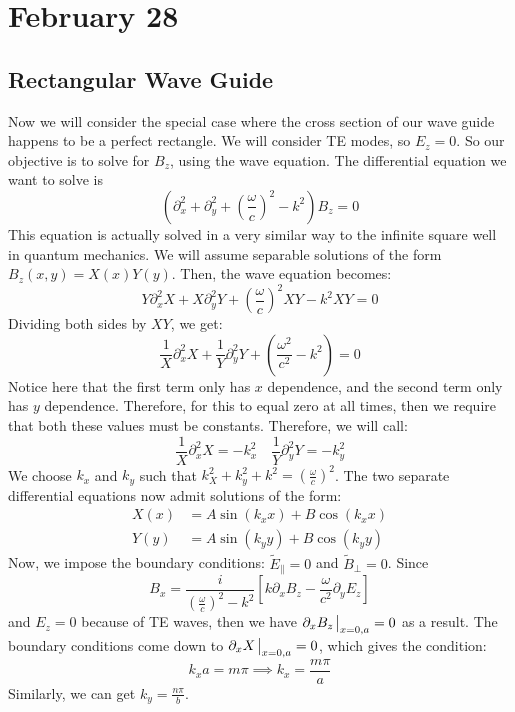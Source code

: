 \section{February 28}
\subsection{Rectangular Wave Guide}
Now we will consider the special case where the cross section of our wave guide happens to be a perfect
rectangle. We will consider TE modes, so \( E_z = 0 \). So our objective is to solve for \( B_z \), using the
wave equation. The differential equation we want to solve is 
\[
	\left( \partial_x^2 + \partial_y^2 + \left( \frac{\omega}{c} \right)^2 - k^2 \right)B_z = 0
\]
This equation is actually solved in a very similar way to the infinite square well in quantum mechanics. We
will assume separable solutions of the form \( B_z(x,y) = X(x) Y(y) \). Then, the wave equation becomes:  
\[
	Y \partial_x^2 X + X \partial_y^2 Y + \left( \frac{\omega}{c} \right)^2 XY - k^2 XY = 0
\]
Dividing both sides by \( XY \), we get:
\[
	\frac{1}{X}\partial_x^2 X + \frac{1}{Y}\partial_y^2 Y + \left( \frac{\omega^2}{c^2} - k^2 \right) = 0
\]
Notice here that the first term only has \( x \) dependence, and the second term only has \( y \) dependence.
Therefore, for this to equal zero at all times, then we require that both these values must be constants.
Therefore, we will call:
\[
	\frac{1}{X}\partial_x^2 X = -k_x^2 \quad \frac{1}{Y}\partial_y^2 Y = -k_y^2
\]
We choose \( k_x \) and \( k_y \) such that \( k_X^2 + k_y^2 + k^2 = \left( \frac{\omega}{c} \right)^2 \).
The two separate differential equations now admit solutions of the form:
\begin{align*}
	X(x) &= A \sin (k_x x) + B \cos (k_x x) \\ 
	Y(y) &= A \sin (k_y y) + B \cos (k_y y)
\end{align*}
Now, we impose the boundary conditions: \( \tilde E_{\parallel} = 0 \) and \( \tilde B_{\perp} =
0 \). Since 
\[
	B_x = \frac{i}{\left( \frac{\omega}{c} \right)^2 - k^2}\left[ k \partial_x B_z -
	\frac{\omega}{c^2}\partial_y E_z \right]
\]
and \( E_z = 0 \) because of TE waves, then we have \( \partial_x B_z\eval_{x = 0, a} = 0 \) as a result. The
boundary conditions come down to \( \partial_x X \eval_{x = 0, a} = 0 \), which gives the condition:
\[
	k_xa = m \pi \implies k_x = \frac{m\pi}{a}
\]
Similarly, we can get \( k_y = \frac{n\pi}{b} \). 

